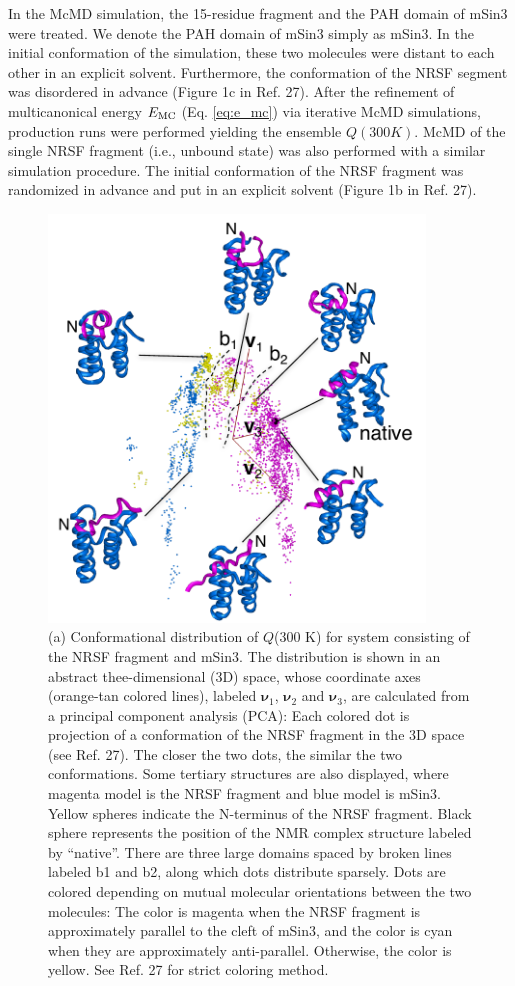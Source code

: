 In the McMD simulation, the 15-residue fragment and the PAH domain of mSin3 were treated. We denote the PAH domain of mSin3 simply as mSin3. In the initial conformation of the simulation, these two molecules were distant to each other in an explicit solvent. Furthermore, the conformation of the NRSF segment was disordered in advance (Figure 1c in Ref. 27). After the refinement of multicanonical energy $E_{\rm MC}$ (Eq. \ref{eq:e_mc}) via iterative McMD simulations, production runs were performed yielding the ensemble $Q(300 K)$. McMD of the single NRSF fragment (i.e., unbound state) was also performed with a similar simulation procedure. The initial conformation of the NRSF fragment was randomized in advance and put in an explicit solvent (Figure 1b in Ref. 27).

\begin{figure}
  \centering
  \includegraphics[width=10cm]{../enhance_rev/figures/msin_nrsf_fel.pdf}
  \caption{\label{fig:msin_nrsf_fel.pdf} (a) Conformational distribution of $Q$(300 K) for system consisting of the NRSF fragment and mSin3. The distribution is shown in an abstract thee-dimensional (3D) space, whose coordinate axes (orange-tan colored lines), labeled $\bm{\nu}_1$, $\bm{\nu}_2$ and $\bm{\nu}_3$, are calculated from a principal component analysis (PCA): Each colored dot is projection of a conformation of the NRSF fragment in the 3D space (see Ref. 27). The closer the two dots, the similar the two conformations. Some tertiary structures are also displayed, where magenta model is the NRSF fragment and blue model is mSin3. Yellow spheres indicate the N-terminus of the NRSF fragment. Black sphere represents the position of the NMR complex structure labeled by “native”. There are three large domains spaced by broken lines labeled b1 and b2, along which dots distribute sparsely. Dots are colored depending on mutual molecular orientations between the two molecules: The color is magenta when the NRSF fragment is approximately parallel to the cleft of mSin3, and the color is cyan when they are approximately anti-parallel. Otherwise, the color is yellow. See Ref. 27 for strict coloring method.
}
\end{figure}
